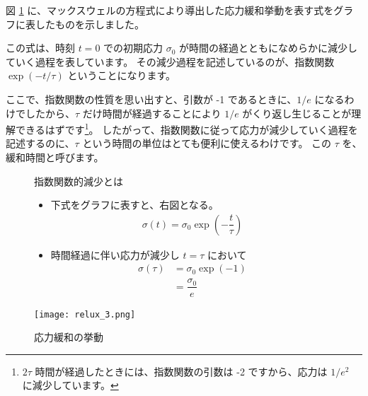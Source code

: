 \documentclass[uplatex,dvipdfmx,a4paper,11pt]{jsarticle}
\begin{document}
図 \ref{fig:stress_relux3} に、マックスウェルの方程式により導出した応力緩和挙動を表す式をグラフに表したものを示しました。

この式は、時刻 $t=0$ での初期応力 $\sigma_0$ が時間の経過とともになめらかに減少していく過程を表しています。
その減少過程を記述しているのが、指数関数 $\exp\left(-t/\tau \right)$ ということになります。

ここで、指数関数の性質を思い出すと、引数が -1 であるときに、$1/e$ になるわけでしたから、$\tau$ だけ時間が経過することにより 
$1/e$ がくり返し生じることが理解できるはずです\footnote{
	$2\tau$ 時間が経過したときには、指数関数の引数は -2 ですから、応力は $1/e^2$ に減少しています。
}。
したがって、指数関数に従って応力が減少していく過程を記述するのに、$\tau$ という時間の単位はとても便利に使えるわけです。
この $\tau$ を、緩和時間と呼びます。

\begin{figure}[htb]
	\begin{center}
		\begin{minipage}{0.45\textwidth}
			\begin{itembox}[l]{指数関数的減少とは}
				\begin{itemize}
					\item 下式をグラフに表すと、右図となる。
					\begin{align*}
						\sigma(t) = \sigma_0 \exp \left(-\dfrac{t}{\tau} \right)
					\end{align*}
					\item 時間経過に伴い応力が減少し $t = \tau$ において
					\begin{align*}
						\sigma(\tau) 
						&= \sigma_0 \exp(-1)\\ 
						&= \dfrac{\sigma_0}{e}
					\end{align*}
				\end{itemize}
			\end{itembox}
		\end{minipage}
		\begin{minipage}{0.48\textwidth}
			\begin{center}
			\texttt{[image: relux\_3.png]}
			\end{center}
		\end{minipage}
		\caption{応力緩和の挙動}
		\label{fig:stress_relux3}
	\end{center}
\end{figure}
\end{document}
